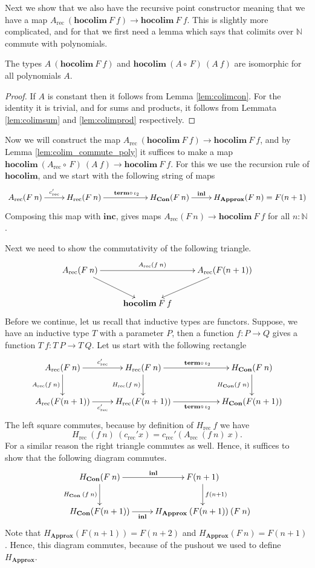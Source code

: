 \documentclass[a4paper,UKenglish]{lipics-v2016}
\newcommand{\Boperator}[1]{\mathrm{\mathbf{#1}}}
\newcommand{\comp}[0]{\circ \,}
\newcommand{\rec}[0]{\operatorname{rec}}
\newcommand{\term}[0]{\textbf{term}}
\newcommand{\Con}[0]{\textbf{Con}}
\newcommand{\Approx}[0]{\textbf{Approx}}
\newcommand{\hocolim}[0]{\Boperator{hocolim}}
\newcommand{\inl}[0]{\Boperator{inl}}
\newcommand{\inc}[0]{\Boperator{inc}}
\begin{document}
Next we show that we also have the recursive point constructor meaning that we have a map $A_{\rec} \> (\hocolim \> F \> f) \rightarrow \hocolim \> F \> f$.
This is slightly more complicated, and for that we first need a lemma which says that colimits over $\mathbb{N}$ commute with polynomials.

\begin{lemma}
\label{lem:colim_commute_poly}
The types $A \> (\hocolim \> F \> f)$ and $\hocolim \> (A \comp F) \> (A \> f)$ are isomorphic for all polynomials $A$.
\end{lemma}

\begin{proof}
If $A$ is constant then it follows from Lemma \ref{lem:colimcon}.
For the identity it is trivial, and for sums and products, it follows from Lemmata \ref{lem:colimsum} and \ref{lem:colimprod} respectively. 
\end{proof}

Now we will construct the map $A_{\rec} \> (\hocolim \> F \> f) \rightarrow \hocolim \> F \> f$, and by Lemma \ref{lem:colim_commute_poly} it suffices to make a map $\hocolim \> (A_{\rec} \comp F) \> (A \> f) \rightarrow \hocolim \> F \> f$.
For this we use the recursion rule of $\hocolim$, and we start with the following string of maps
\[
\xymatrix
{
		A_{\rec}(F \> n) \ar[r]^-{c_{\rec}'} 
		& H_{\rec}(F \> n) \ar[rr]^{\term \comp \iota_2} &
		& H_{\Con}(F \> n) \ar[r]^-{\inl}
		& H_{\Approx}(F \> n) = F(n + 1)
}
\]
Composing this map with $\inc$, gives maps $A_{\rec}(F \> n) \rightarrow \hocolim \> F \> f$ for all $n : \mathbb{N}$.

Next we need to show the commutativity of the following triangle.
\[
\xymatrix
{
	A_{\rec}(F \> n) \ar[rr]^{A_{\rec}(f \> n)} \ar[dr] & & A_{\rec}(F(n+1)) \ar[dl] \\
	& \hocolim \> F \> f &
}
\]
Before we continue, let us recall that inductive types are functors.
Suppose, we have an inductive type $T$ with a parameter $P$, then a function $f : P \rightarrow Q$ gives a function $T \> f : T \> P \rightarrow T \> Q$.
Let us start with the following rectangle
\[
\xymatrix
{
	A_{\rec}(F \> n) \ar[r]^-{c_{\rec}'} \ar[d]_{A_{\rec}(f \> n)} 
		& H_{\rec}(F \> n) \ar[rr]^{\term \comp \iota_2} \ar[d]_{H_{\rec}(f \> n)} &
		& H_{\Con}(F \> n) \ar[d]_{H_{\Con}(f \> n)}\\
	A_{\rec}(F(n+1)) \ar[r]_-{c_{\rec}'} 
		& H_{\rec}(F(n+1)) \ar[rr]_{\term \comp \iota_2} &
		& H_{\Con}(F(n+1))
}
\]
The left square commutes, because by definition of $H_{\rec} \> f$ we have
\[
H_{\rec} \>(f \> n) \> (c_{\rec}' x) = c_{\rec}' (A_{\rec} \> (f \> n) \> x).
\]
For a similar reason the right triangle commutes as well.
Hence, it suffices to show that the following diagram commutes.
\[
\xymatrix
{
	H_{\Con}(F \> n) \ar[d]_{H_{\Con} \> (f \> n)} \ar[r]^-{\inl}
		& F(n+1) \ar[d]^{f(n+1)}\\
	H_{\Con}(F(n+1)) \ar[r]_-{\inl}
		& H_{\Approx} \> (F(n+1)) \> (F \> n)
}
\]
Note that $H_{\Approx}(F(n+1)) = F(n+2)$ and $H_{\Approx}(F \> n) = F(n+1)$.
Hence, this diagram commutes, because of the pushout we used to define $H_{\Approx}$.
\end{document}
